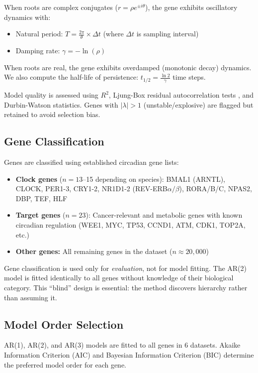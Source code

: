 \documentclass[11pt,letterpaper]{article}
\begin{document}
When roots are complex conjugates ($r = \rho e^{\pm i\theta}$), the gene exhibits oscillatory dynamics with:
\begin{itemize}
\item Natural period: $T = \frac{2\pi}{\theta} \times \Delta t$ (where $\Delta t$ is sampling interval)
\item Damping rate: $\gamma = -\ln(\rho)$
\end{itemize}

When roots are real, the gene exhibits overdamped (monotonic decay) dynamics. We also compute the half-life of persistence: $t_{1/2} = \frac{\ln 2}{\gamma}$ time steps.

Model quality is assessed using $R^2$, Ljung-Box residual autocorrelation tests \citep{ljung1978measure}, and Durbin-Watson statistics. Genes with $|\lambda| > 1$ (unstable/explosive) are flagged but retained to avoid selection bias.

\subsection{Gene Classification}

Genes are classified using established circadian gene lists:
\begin{itemize}
\item \textbf{Clock genes} ($n = 13$--15 depending on species): BMAL1 (ARNTL), CLOCK, PER1-3, CRY1-2, NR1D1-2 (REV-ERB$\alpha/\beta$), RORA/B/C, NPAS2, DBP, TEF, HLF \citep{takahashi2017transcriptional, ko2006molecular}
\item \textbf{Target genes} ($n = 23$): Cancer-relevant and metabolic genes with known circadian regulation (WEE1, MYC, TP53, CCND1, ATM, CDK1, TOP2A, etc.) \citep{fu2003circadian, masri2015circadian}
\item \textbf{Other genes:} All remaining genes in the dataset ($n \approx 20{,}000$)
\end{itemize}

Gene classification is used only for \textit{evaluation}, not for model fitting. The AR(2) model is fitted identically to all genes without knowledge of their biological category. This ``blind'' design is essential: the method discovers hierarchy rather than assuming it.

\subsection{Model Order Selection}

AR(1), AR(2), and AR(3) models are fitted to all genes in 6 datasets. Akaike Information Criterion (AIC) \citep{akaike1974new} and Bayesian Information Criterion (BIC) \citep{schwarz1978estimating} determine the preferred model order for each gene.
\end{document}
